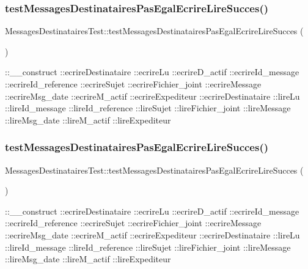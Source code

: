 \subsubsection{\texorpdfstring{test\+Messages\+Destinataires\+Pas\+Egal\+Ecrire\+Lire\+Succes()}{testMessagesDestinatairesPasEgalEcrireLireSucces()}\hspace{0.1cm}{\footnotesize\ttfamily [1/2]}}
{\footnotesize\ttfamily Messages\+Destinataires\+Test\+::test\+Messages\+Destinataires\+Pas\+Egal\+Ecrire\+Lire\+Succes (\begin{DoxyParamCaption}{ }\end{DoxyParamCaption})}

\+::\+\_\+\+\_\+construct  \+::ecrire\+Destinataire  \+::ecrire\+Lu  \+::ecrire\+D\+\_\+actif  \+::ecrire\+Id\+\_\+message  \+::ecrire\+Id\+\_\+reference  \+::ecrire\+Sujet  \+::ecrire\+Fichier\+\_\+joint  \+::ecrire\+Message  \+::ecrire\+Msg\+\_\+date  \+::ecrire\+M\+\_\+actif  \+::ecrire\+Expediteur  \+::ecrire\+Destinataire  \+::lire\+Lu  \+::lire\+Id\+\_\+message  \+::lire\+Id\+\_\+reference  \+::lire\+Sujet  \+::lire\+Fichier\+\_\+joint  \+::lire\+Message  \+::lire\+Msg\+\_\+date  \+::lire\+M\+\_\+actif  \+::lire\+Expediteur \mbox{\label{class_messages_destinataires_test_a176c681d7d5638b906154d55ac7effa2}} 
\subsubsection{\texorpdfstring{test\+Messages\+Destinataires\+Pas\+Egal\+Ecrire\+Lire\+Succes()}{testMessagesDestinatairesPasEgalEcrireLireSucces()}\hspace{0.1cm}{\footnotesize\ttfamily [2/2]}}
{\footnotesize\ttfamily Messages\+Destinataires\+Test\+::test\+Messages\+Destinataires\+Pas\+Egal\+Ecrire\+Lire\+Succes (\begin{DoxyParamCaption}{ }\end{DoxyParamCaption})}

\+::\+\_\+\+\_\+construct  \+::ecrire\+Destinataire  \+::ecrire\+Lu  \+::ecrire\+D\+\_\+actif  \+::ecrire\+Id\+\_\+message  \+::ecrire\+Id\+\_\+reference  \+::ecrire\+Sujet  \+::ecrire\+Fichier\+\_\+joint  \+::ecrire\+Message  \+::ecrire\+Msg\+\_\+date  \+::ecrire\+M\+\_\+actif  \+::ecrire\+Expediteur  \+::ecrire\+Destinataire  \+::lire\+Lu  \+::lire\+Id\+\_\+message  \+::lire\+Id\+\_\+reference  \+::lire\+Sujet  \+::lire\+Fichier\+\_\+joint  \+::lire\+Message  \+::lire\+Msg\+\_\+date  \+::lire\+M\+\_\+actif  \+::lire\+Expediteur 

